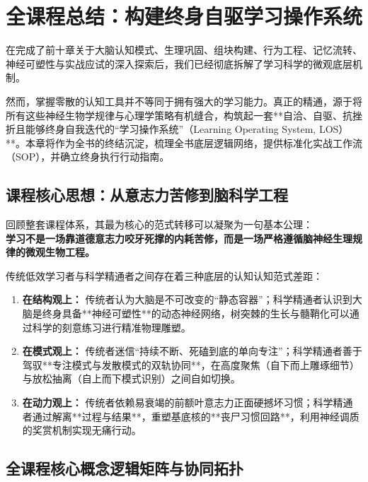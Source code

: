 \documentclass[12pt,a4paper,openany]{ctexbook}
\begin{document}
\chapter{全课程总结：构建终身自驱学习操作系统}

在完成了前十章关于大脑认知模式、生理巩固、组块构建、行为工程、记忆流转、神经可塑性与实战应试的深入探索后，我们已经彻底拆解了学习科学的微观底层机制。

然而，掌握零散的认知工具并不等同于拥有强大的学习能力。真正的精通，源于将所有这些神经生物学规律与心理学策略有机缝合，构筑起一套**自洽、自驱、抗挫折且能够终身自我迭代的“学习操作系统”（Learning Operating System, LOS）**。本章将作为全书的终结沉淀，梳理全书底层逻辑网络，提供标准化实战工作流（SOP），并确立终身执行行动指南。

\section{课程核心思想：从意志力苦修到脑科学工程}

回顾整套课程体系，其最为核心的范式转移可以凝聚为一句基本公理：\\
\textbf{学习不是一场靠道德意志力咬牙死撑的内耗苦修，而是一场严格遵循脑神经生理规律的微观生物工程。}

传统低效学习者与科学精通者之间存在着三种底层的认知认知范式差距：
\begin{enumerate}
    \item \textbf{在结构观上：} 传统者认为大脑是不可改变的“静态容器”；科学精通者认识到大脑是终身具备**神经可塑性**的动态神经网络，树突棘的生长与髓鞘化可以通过科学的刻意练习进行精准物理雕塑。
    \item \textbf{在模式观上：} 传统者迷信“持续不断、死磕到底的单向专注”；科学精通者善于驾驭**专注模式与发散模式的双轨协同**，在高度聚焦（自下而上雕琢细节）与放松抽离（自上而下模式识别）之间自如切换。
    \item \textbf{在动力观上：} 传统者依赖易衰竭的前额叶意志力正面硬撼坏习惯；科学精通者通过解离**过程与结果**，重塑基底核的**丧尸习惯回路**，利用神经调质的奖赏机制实现无痛行动。
\end{enumerate}

\section{全课程核心概念逻辑矩阵与协同拓扑}
\end{document}
